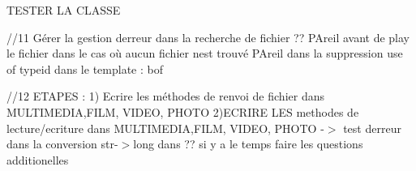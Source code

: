 TESTER LA CLASSE

//11 Gérer la gestion d\textquotesingle{}erreur dans la recherche de fichier ?? PAreil avant de play le fichier dans le cas où aucun fichier n\textquotesingle{}est trouvé PAreil dans la suppression use of typeid dans le template \+: bof

//12 ETAPES \+: 1) Ecrire les méthodes de renvoi de fichier dans MULTIMEDIA,FILM, VIDEO, PHOTO 2)ECRIRE LES methodes de lecture/ecriture dans MULTIMEDIA,FILM, VIDEO, PHOTO -\/\texorpdfstring{$>$}{>} test d\textquotesingle{}erreur dans la conversion str-\/\texorpdfstring{$>$}{>}long dans ?? si y a le temps faire les questions additionelles 